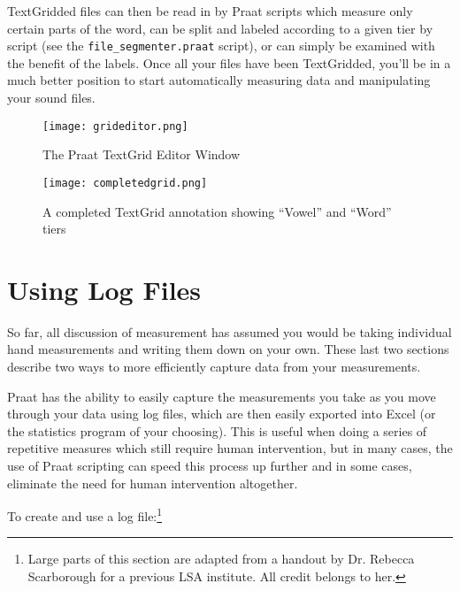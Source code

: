 \documentclass[11pt]{article}
\begin{document}
TextGridded files can then be read in by Praat scripts which measure
only certain parts of the word, can be split and labeled according to a
given tier by script (see the \texttt{file\_segmenter.praat} script), or
can simply be examined with the benefit of the labels. Once all your
files have been TextGridded, you'll be in a much better position to
start automatically measuring data and manipulating your sound files.

\begin{figure}
  \centerline{
    \mbox{\texttt{[image: grideditor.png]}}
  }
    \caption{The Praat TextGrid Editor Window \label{grideditor}}
  
  \end{figure}

\begin{figure}
  \centerline{
    \mbox{\texttt{[image: completedgrid.png]}}
  }
    \caption{A completed TextGrid annotation showing “Vowel” and “Word” tiers\label{completedgrid}}
  
  \end{figure}

\hypertarget{using-log-files}{%
\section{Using Log Files}\label{using-log-files}}

So far, all discussion of measurement has assumed you would be taking
individual hand measurements and writing them down on your own. These
last two sections describe two ways to more efficiently capture data
from your measurements.

Praat has the ability to easily capture the measurements you take as you
move through your data using log files, which are then easily exported
into Excel (or the statistics program of your choosing). This is useful
when doing a series of repetitive measures which still require human
intervention, but in many cases, the use of Praat scripting can speed
this process up further and in some cases, eliminate the need for human
intervention altogether.

To create and use a log
file:\footnote{Large parts of this section are adapted from a handout by Dr. Rebecca Scarborough for a previous LSA institute.  All credit belongs to her.}
\end{document}
